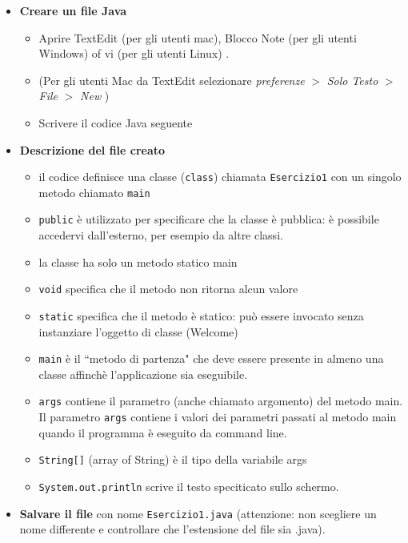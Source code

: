 \documentclass{article}
\theoremstyle{definition}
\begin{document}
\begin{itemize}
\item \textbf{Creare un file Java}
\begin{itemize}
\item Aprire  TextEdit (per gli utenti mac), Blocco Note (per gli utenti Windows) of vi (per gli utenti Linux) .
\item (Per gli utenti Mac da TextEdit selezionare \textit{preferenze} $>$ \textit{Solo Testo} $>$ \textit{File} $>$ \textit{New} )
\item Scrivere il codice  Java seguente
\end{itemize}
\end{itemize}

\begin{itemize}
\item \textbf{Descrizione del file creato}
\begin{itemize}
\item il codice definisce una classe (\texttt{class}) chiamata  \texttt{Esercizio1} con un singolo metodo  chiamato \texttt{main}
\item \texttt{public} \`e utilizzato per specificare che la classe \`e pubblica: \`e possibile accedervi dall'esterno, per esempio da altre classi.
\item la classe ha solo un metodo statico main
\item \texttt{void} specifica che il metodo non ritorna alcun valore
\item \texttt{static} specifica che il metodo \`e statico: pu\`o essere invocato senza instanziare l'oggetto di classe  (Welcome)
\item \texttt{main} \`e il ``metodo di partenza" che deve essere presente in almeno una classe affinch\`e l'applicazione sia eseguibile. 
\item \texttt{args} contiene il parametro (anche chiamato argomento) del metodo main. Il parametro \texttt{args} contiene i valori dei parametri passati al metodo main quando il programma \`e eseguito da command line.
\item \texttt{String[]} (array of String) \`e il tipo della variabile args 
\item \texttt{System.out.println} scrive il testo speciticato sullo schermo.
\end{itemize}
\end{itemize}
\begin{itemize}
\item \textbf{Salvare il file} con nome \texttt{Esercizio1.java} (attenzione: non scegliere un nome differente e controllare che l'estensione del file sia .java).
\end{itemize}
\end{document}
